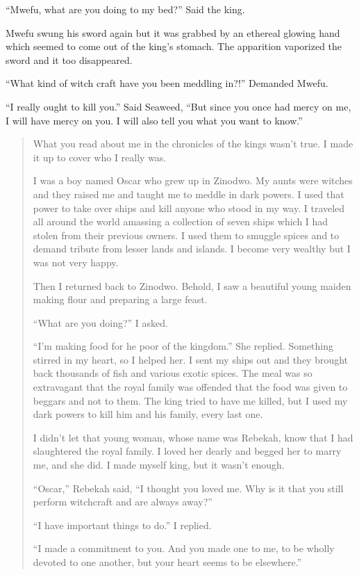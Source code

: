 ``Mwefu, what are you doing to my bed?'' Said the king.

Mwefu swung his sword again but it was grabbed by an ethereal glowing hand which seemed to come out of the king's stomach. The apparition vaporized the sword and it too disappeared.

``What kind of witch craft have you been meddling in?!'' Demanded Mwefu.

``I really ought to kill you.'' Said Seaweed, ``But since you once had mercy on me, I will have mercy on you. I will also tell you what you want to know.''

\begin{quote}
What you read about me in the chronicles of the kings wasn't true. I made it up to cover who I really was.

I was a boy named Oscar who grew up in Zinodwo. My aunts were witches and they raised me and taught me to meddle in dark powers. I used that power to take over ships and kill anyone who stood in my way. I traveled all around the world amassing a collection of seven ships which I had stolen from their previous owners. I used them to smuggle spices and to demand tribute from lesser lands and islands. I become very wealthy but I was not very happy.

Then I returned back to Zinodwo. Behold, I saw a beautiful young maiden making flour and preparing a large feast.

``What are you doing?'' I asked.

``I'm making food for he poor of the kingdom.'' She replied. Something stirred in my heart, so I helped her. I sent my ships out and they brought back thousands of fish and various exotic spices. The meal was so extravagant that the royal family was offended that the food was given to beggars and not to them. The king tried to have me killed, but I used my dark powers to kill him and his family, every last one.

I didn't let that young woman, whose name was Rebekah, know that I had slaughtered the royal family. I loved her dearly and begged her to marry me, and she did. I made myself king, but it wasn't enough.

``Oscar,'' Rebekah said, ``I thought you loved me. Why is it that you still perform witchcraft and are always away?''

``I have important things to do.'' I replied.

``I made a commitment to you. And you made one to me, to be wholly devoted to one another, but your heart seems to be elsewhere.''


\end{quote}
